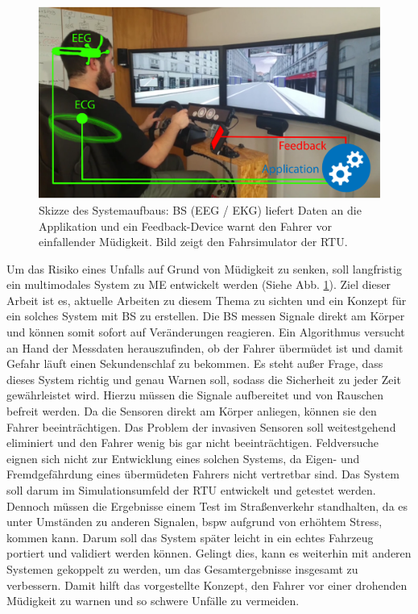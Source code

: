 {\begin{figure} 
  \begin{center}
    \includegraphics[width=12cm]{img/aufbau}
    \caption{Skizze des Systemaufbaus: \acl{BS} (EEG / EKG) liefert Daten an die Applikation und ein Feedback-Device warnt den Fahrer vor einfallender Müdigkeit. Bild zeigt den Fahrsimulator der \acl{RTU}.}
    \label{fig:sketch}
  \end{center}
\end{figure}

Um das Risiko eines Unfalls auf Grund von Müdigkeit zu senken, soll langfristig ein multimodales System zu \acl{ME} entwickelt werden (Siehe Abb. \ref{fig:sketch}). Ziel dieser Arbeit ist es, aktuelle Arbeiten zu diesem Thema zu sichten und ein Konzept für ein solches System mit \acl{BS} zu erstellen. Die \acl{BS} messen Signale direkt am Körper und können somit sofort auf Veränderungen reagieren. Ein Algorithmus versucht an Hand der Messdaten herauszufinden, ob der Fahrer übermüdet ist und damit Gefahr läuft einen Sekundenschlaf zu bekommen. Es steht außer Frage, dass dieses System richtig und genau Warnen soll, sodass die Sicherheit zu jeder Zeit gewährleistet wird. Hierzu müssen die Signale aufbereitet und von Rauschen befreit werden. Da die Sensoren direkt am Körper anliegen, können sie den Fahrer beeinträchtigen. Das Problem der invasiven Sensoren soll weitestgehend eliminiert und den Fahrer wenig bis gar nicht beeinträchtigen. Feldversuche eignen sich nicht zur Entwicklung eines solchen Systems, da Eigen- und Fremdgefährdung eines übermüdeten Fahrers nicht vertretbar sind. Das System soll darum im Simulationsumfeld der \acl{RTU} entwickelt und getestet werden. Dennoch müssen die Ergebnisse einem Test im Straßenverkehr standhalten, da es unter Umständen zu anderen Signalen, \acl{bspw} aufgrund von erhöhtem Stress, kommen kann. Darum soll das System später leicht in ein echtes Fahrzeug portiert und validiert werden können. Gelingt dies, kann es weiterhin mit anderen Systemen gekoppelt zu werden, um das Gesamtergebnisse insgesamt zu verbessern. Damit hilft das vorgestellte Konzept, den Fahrer vor einer drohenden Müdigkeit zu warnen und so schwere Unfälle zu vermeiden.\\ 

}
